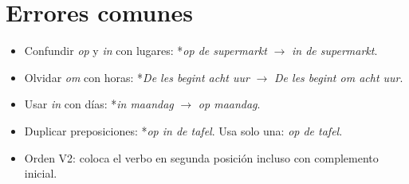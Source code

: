 \section{Errores comunes}
\begin{itemize}[leftmargin=*]
  \item Confundir \textit{op} y \textit{in} con lugares: *\textit{op de supermarkt} $\rightarrow$ \textit{in de supermarkt}.
  \item Olvidar \textit{om} con horas: *\textit{De les begint acht uur} $\rightarrow$ \textit{De les begint om acht uur}.
  \item Usar \textit{in} con días: *\textit{in maandag} $\rightarrow$ \textit{op maandag}.
  \item Duplicar preposiciones: *\textit{op in de tafel}. Usa solo una: \textit{op de tafel}.
  \item Orden V2: coloca el verbo en segunda posición incluso con complemento inicial.
\end{itemize}
